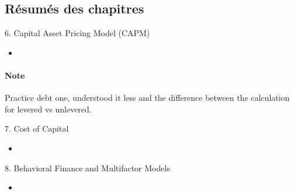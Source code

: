 \subsection{Résumés des chapitres}

\begin{CHPT_SUMM_AUTO}[label = {L.-6}]{6. Capital Asset Pricing Model (CAPM)}
	\begin{itemize}
		\item	
	\end{itemize}
	
\paragraph{Note}	Practice debt one, understood it less and the difference between the calculation for levered vs unlevered.
\end{CHPT_SUMM_AUTO}

\begin{CHPT_SUMM_AUTO}[label = {L.-7}]{7. Cost of Capital}
	\begin{itemize}
		\item	
	\end{itemize}
\end{CHPT_SUMM_AUTO}

\begin{CHPT_SUMM_AUTO}[label = {L.-8}]{8. Behavioral Finance and Multifactor Models}
	\begin{itemize}
		\item	
	\end{itemize}
\end{CHPT_SUMM_AUTO}

